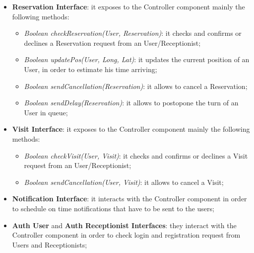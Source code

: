 \begin{itemize}
\item \textbf{Reservation Interface}: it exposes to the Controller component mainly the following methods:
\begin{itemize}
\item \textit{Boolean checkReservation(User, Reservation)}: it checks and confirms or declines a Reservation request from an User/Receptionist;
\item \textit{Boolean updatePos(User, Long, Lat)}: it updates the current position of an User, in order to estimate his time arriving;
\item \textit{Boolean sendCancellation(Reservation)}: it allows to cancel a Reservation; 
\item \textit{Boolean sendDelay(Reservation)}: it allows to postopone the turn of an User in queue;
\end{itemize}



\item \textbf{Visit Interface}: it exposes to the Controller component mainly the following methods:
\begin{itemize}
\item \textit{Boolean checkVisit(User, Visit)}: it checks and confirms or declines a Visit request from an User/Receptionist;
\item \textit{Boolean sendCancellation(User, Visit)}: it allows to cancel a Visit; 
\end{itemize}


\item \textbf{Notification Interface}: it interacts with the Controller component in order to schedule on time notifications that have to be sent to the users;

\item \textbf{Auth User} and \textbf{Auth Receptionist Interfaces}: they interact with the Controller component in order to check login and registration request from Users and Receptionists;


\end{itemize}
